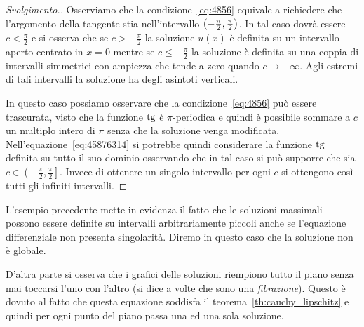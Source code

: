 \begin{proof}[Svolgimento.]
Osserviamo che la condizione~\eqref{eq:4856} equivale a richiedere che l'argomento
della tangente stia nell'intervallo ${\left( -\frac \pi 2, \frac \pi 2 \right)}$.
In tal caso dovrà essere $c<\frac\pi 2$ e si osserva che se $c>-\frac \pi 2$
la soluzione $u(x)$ è definita su un intervallo aperto centrato in $x=0$ mentre
se $c \le -\frac \pi 2$ la soluzione è definita su una coppia di intervalli
simmetrici con ampiezza che tende a zero quando $c\to -\infty$.
Agli estremi di tali intervalli la soluzione ha degli asintoti verticali.

In questo caso possiamo osservare che la condizione~\eqref{eq:4856} può essere
trascurata, visto che la funzione $\operatorname{tg}$ è $\pi$-periodica e quindi
è possibile sommare a $c$ un multiplo intero di $\pi$ senza che la soluzione
venga modificata.
Nell'equazione~\eqref{eq:45876314} si potrebbe
quindi considerare la funzione $\operatorname{tg}$
definita su tutto il suo dominio osservando che in tal caso si può
supporre che sia $c\in \left(-\frac \pi 2, \frac \pi 2\right]$.
Invece di ottenere un singolo intervallo per ogni $c$ si ottengono così
tutti gli infiniti intervalli.
\end{proof}

\begin{remark}
L'esempio precedente mette in evidenza il fatto che le soluzioni massimali possono essere definite
su intervalli arbitrariamente piccoli anche se l'equazione differenziale
non presenta singolarità. Diremo in questo caso che
la soluzione non è globale.

D'altra parte si osserva che i grafici delle soluzioni riempiono tutto il piano senza 
mai toccarsi l'uno con l'altro (si dice a volte che sono una \emph{fibrazione}).
Questo è dovuto al fatto che questa equazione soddisfa il 
teorema~\ref{th:cauchy_lipschitz} e quindi per ogni punto 
del piano passa una ed una sola soluzione.
\end{remark}

